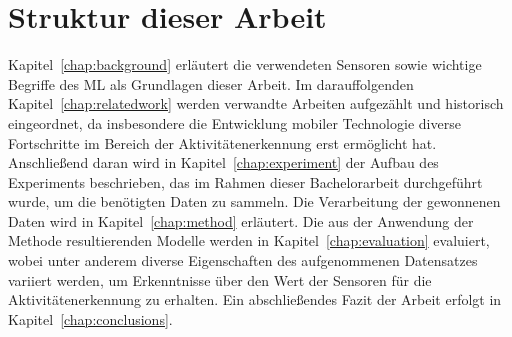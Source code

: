 \section{Struktur dieser Arbeit}
Kapitel~\ref{chap:background} erläutert die verwendeten Sensoren sowie wichtige Begriffe des \acf{ML} als Grundlagen dieser Arbeit. Im darauffolgenden Kapitel~\ref{chap:relatedwork} werden verwandte Arbeiten aufgezählt und historisch eingeordnet, da insbesondere die Entwicklung mobiler Technologie diverse Fortschritte im Bereich der Aktivitätenerkennung erst ermöglicht hat. Anschließend daran wird in Kapitel~\ref{chap:experiment} der Aufbau des Experiments beschrieben, das im Rahmen dieser Bachelorarbeit durchgeführt wurde, um die benötigten Daten zu sammeln. Die Verarbeitung der gewonnenen Daten wird in Kapitel~\ref{chap:method} erläutert. Die aus der Anwendung der Methode resultierenden Modelle werden in Kapitel~\ref{chap:evaluation} evaluiert, wobei unter anderem diverse Eigenschaften des aufgenommenen Datensatzes variiert werden, um Erkenntnisse über den Wert der Sensoren für die Aktivitätenerkennung zu erhalten. Ein abschließendes Fazit der Arbeit erfolgt in Kapitel~\ref{chap:conclusions}.

